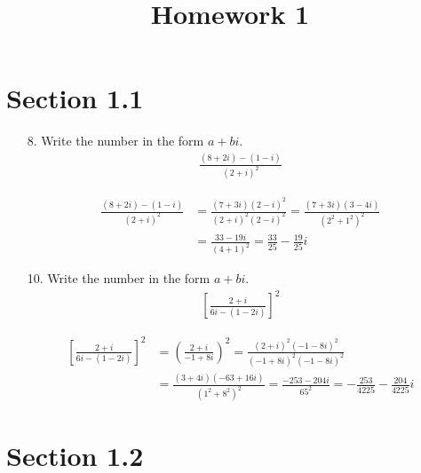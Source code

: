 \documentclass{article}
\begin{document}
\title{Homework 1}
\maketitle
\thispagestyle{fancy}

\section*{Section 1.1}

\begin{itemize}
	\item[8.] Write the number in the form $a+bi.$
		\begin{align*}
			\frac{(8+2i)-(1-i)}{(2+i)^2}
		\end{align*}
		\begin{soln}
			\begin{align*}
				\frac{(8+2i)-(1-i)}{(2+i)^2} &= \frac{(7+3i)(2-i)^2}{(2+i)^2(2-i)^2} = \frac{(7+3i)(3-4i)}{(2^2+1^2)^2} \\
				&= \frac{33-19i}{(4+1)^2} = \boxed{\frac{33}{25} - \frac{19}{25}i}
			\end{align*}
		\end{soln}

	\item[10.] Write the number in the form $a+bi.$
		\begin{align*}
			\left[ \frac{2+i}{6i-(1-2i)} \right]^2
		\end{align*}
		\begin{soln}
			\begin{align*}
				\left[ \frac{2+i}{6i-(1-2i)} \right]^2 &= \left( \frac{2+i}{-1+8i} \right)^2 = \frac{(2+i)^2(-1-8i)^2}{(-1+8i)^2(-1-8i)^2} \\
				&= \frac{(3+4i)(-63+16i)}{(1^2+8^2)^2} = \frac{-253-204i}{65^2} = \boxed{-\frac{253}{4225} - \frac{204}{4225}i}
			\end{align*}
		\end{soln}

\end{itemize}

\section*{Section 1.2}
\end{document}
